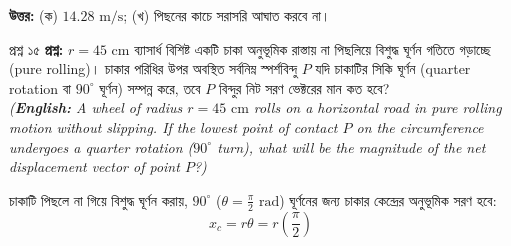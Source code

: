 \documentclass[11pt,a4paper]{article}
\begin{document}
\begin{solbox}
\begin{solbox}
\textbf{উত্তর:} (ক) $14.28\text{ m/s}$; (খ) পিছনের কাচে সরাসরি আঘাত করবে না।
\end{solbox}

\vspace{0.4cm}

\begin{qbox}{প্রশ্ন ১৫}
\textbf{প্রশ্ন:} $r = 45\text{ cm}$ ব্যাসার্ধ বিশিষ্ট একটি চাকা অনুভূমিক রাস্তায় না পিছলিয়ে বিশুদ্ধ ঘূর্ণন গতিতে গড়াচ্ছে (pure rolling)। চাকার পরিধির উপর অবস্থিত সর্বনিম্ন স্পর্শবিন্দু $P$ যদি চাকাটির সিকি ঘূর্ণন (quarter rotation বা $90^\circ$ ঘূর্ণন) সম্পন্ন করে, তবে $P$ বিন্দুর নিট সরণ ভেক্টরের মান কত হবে? \\
\textit{(\textbf{English:} A wheel of radius $r = 45\text{ cm}$ rolls on a horizontal road in pure rolling motion without slipping. If the lowest point of contact $P$ on the circumference undergoes a quarter rotation ($90^\circ$ turn), what will be the magnitude of the net displacement vector of point $P$?)}
\end{qbox}

\begin{solbox}
\begin{center}
\end{center}

চাকাটি পিছলে না গিয়ে বিশুদ্ধ ঘূর্ণন করায়, $90^\circ$ ($\theta = \frac{\pi}{2}\text{ rad}$) ঘূর্ণনের জন্য চাকার কেন্দ্রের অনুভূমিক সরণ হবে:
$$x_c = r\theta = r\left(\frac{\pi}{2}\right)$$


\end{solbox}
\end{solbox}
\end{document}
